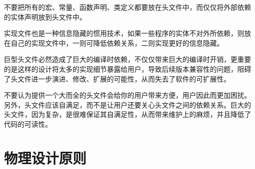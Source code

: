 \begin{content}
不要把所有的宏、常量、函数声明、类定义都要放在头文件中，而仅仅将外部依赖的实体声明放到头文件中。

实现文件也是一种信息隐藏的惯用技术，如果一些程序的实体不对外所依赖，则放在自己的实现文件中，一则可降低依赖关系，二则实现更好的信息隐藏。

巨型头文件必然造成了巨大的编译时依赖，不仅仅带来巨大的编译时开销，更重要的是这样的设计将太多的实现细节暴露给用户，导致后续版本兼容性的问题，阻碍了头文件进一步演进、修改、扩展的可能性，从而失去了软件的可扩展性。

不要认为提供一个大而全的头文件会给你的用户带来方便，用户因此而更加困扰。另外，头文件应该自满足，而不是让用户还要关心头文件之间的依赖关系。巨大的头文件，因为复杂，是很难保证其自满足性，从而带来维护上的麻烦，并且降低了代码的可读性。

\end{content}

\section{物理设计原则}

